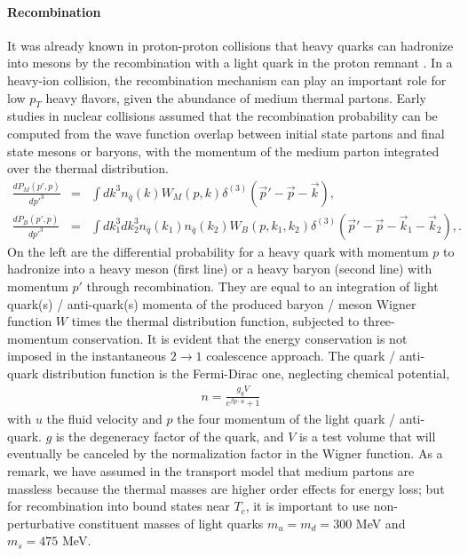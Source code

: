 \paragraph{Recombination}
It was already known in proton-proton collisions that heavy quarks can hadronize into mesons by the recombination with a light quark in the proton remnant \cite{Mehen:2003rf}.
In a heavy-ion collision, the recombination mechanism can play an important role for low $p_T$ heavy flavors, given the abundance of medium thermal partons.
Early studies in nuclear collisions \cite{Oh:2009zj} assumed that the recombination probability can be computed from the wave function overlap between initial state partons and final state mesons or baryons, with the momentum of the medium parton integrated over the thermal distribution.
\begin{eqnarray}
\frac{dP_M(p', p)}{dp'^3} &=& \int dk^3 n_{\bar{q}}(k) W_{M}(p, k)\delta^{(3)}(\vec{p}'-\vec{p}-\vec{k}), \label{eq:meson_recombine}\\
\frac{dP_B(p', p)}{dp'^3} &=& \int dk_1^3 dk_2^3 n_{\bar{q}}(k_1)  n_{\bar{q}}(k_2) W_{B}(p, k_1, k_2)\delta^{(3)}(\vec{p}'-\vec{p}-\vec{k}_1 - \vec{k}_2), \label{eq:baryon_recombine}.
\end{eqnarray}
On the left are the differential probability for a heavy quark with momentum $p$ to hadronize into a heavy meson (first line) or a heavy baryon (second line) with momentum $p'$ through recombination.
They are equal to an integration of light quark(s) / anti-quark(s) momenta of the produced baryon / meson Wigner function $W$ times the thermal distribution function, subjected to three-momentum conservation.
It is evident that the energy conservation is not imposed in the instantaneous $2\rightarrow 1$ coalescence approach.
The quark / anti-quark distribution function is the Fermi-Dirac one, neglecting chemical potential, 
\begin{eqnarray}
n = \frac{g_q V}{e^{\beta p\cdot u} + 1}
\end{eqnarray}
with $u$ the fluid velocity and $p$ the four momentum of the light quark / anti-quark.
$g$ is the degeneracy factor of the quark, and $V$ is a test volume that will eventually be canceled by the normalization factor in the Wigner function.
As a remark, we have assumed in the transport model that medium partons are massless because the thermal masses are higher order effects for energy loss; but for recombination into bound states near $T_c$, it is important to use non-perturbative constituent masses of light quarks $m_u = m_d = 300$ MeV and $m_s = 475$ MeV.

